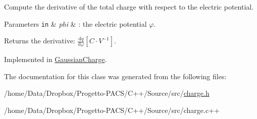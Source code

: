 Compute the derivative of the total charge with respect to the electric potential. 


\begin{DoxyParams}[1]{Parameters}
\mbox{\tt in}  & {\em phi} & \-: the electric potential $ \varphi $. \\
\hline
\end{DoxyParams}
\begin{DoxyReturn}{Returns}
the derivative\-: $ \frac{\mathrm{d}q}{\mathrm{d}\varphi} \left[ C \cdot V^{-1} \right] $. 
\end{DoxyReturn}


Implemented in \hyperlink{classGaussianCharge_a06f7a60ee2bce4590e2a12286aa0e9eb}{Gaussian\-Charge}.



The documentation for this class was generated from the following files\-:\begin{DoxyCompactItemize}
\item 
/home/\-Data/\-Dropbox/\-Progetto-\/\-P\-A\-C\-S/\-C++/\-Source/src/\hyperlink{charge_8h}{charge.\-h}\item 
/home/\-Data/\-Dropbox/\-Progetto-\/\-P\-A\-C\-S/\-C++/\-Source/src/charge.\-c++\end{DoxyCompactItemize}
